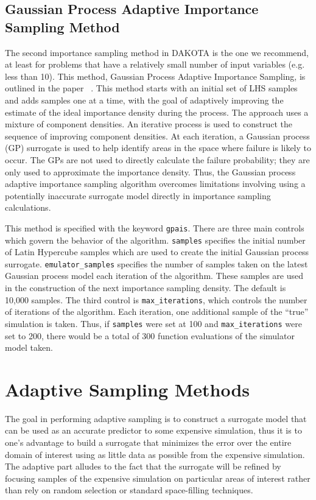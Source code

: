\subsection{Gaussian Process Adaptive Importance Sampling Method}\label{uq:gpais}
The second importance sampling method in DAKOTA is the one we recommend,
at least for problems that have a relatively small number of input variables (e.g.
less than 10).  This method, Gaussian Process Adaptive Importance Sampling,
is outlined in the paper ~\cite{Dalbey2012}.
This method  starts with an initial set of LHS samples and adds samples one at a time, 
with the goal of adaptively improving the estimate of the ideal importance density
during the process.  The approach uses a mixture of component densities.  An
iterative process is used
to construct the sequence of improving component densities. At each
iteration, a Gaussian process (GP) surrogate is used to help identify areas
in the space where failure is likely to occur.  The GPs are not used to
directly calculate the failure probability; they are only used to approximate
the importance density. Thus, the Gaussian process adaptive importance
sampling algorithm overcomes limitations involving using a potentially
inaccurate surrogate model directly in importance sampling calculations.

This method is specified with the keyword \texttt{gpais}.  There are three 
main controls which govern the behavior of the algorithm. 
\texttt{samples} specifies the initial number of Latin Hypercube samples 
which are used to create the initial Gaussian process surrogate. 
\texttt{emulator\_samples} specifies the number of samples taken on the 
latest Gaussian process model each iteration of the algorithm. 
These samples are used in the construction of the next importance 
sampling density.  The default is 10,000 samples.  The third control 
is \texttt{max\_iterations}, which controls the number of iterations 
of the algorithm.  Each iteration, one additional sample of the ``true'' 
simulation is taken.  Thus, if \texttt{samples} were set at 100 and 
\texttt{max\_iterations} were set to 200, there would be a total of 
300 function evaluations of the simulator model taken. 

\section{Adaptive Sampling Methods}\label{uq:adaptive}
The goal in performing adaptive sampling is to construct a surrogate model that
can be used as an accurate predictor to some expensive simulation, thus it is
to one's advantage to build a surrogate that minimizes the error over the entire
domain of interest using as little data as possible from the expensive
simulation.  The adaptive part alludes to the fact that the surrogate will be
refined by focusing samples of the expensive simulation on particular areas of
interest rather than rely on random selection or standard space-filling
techniques. 

